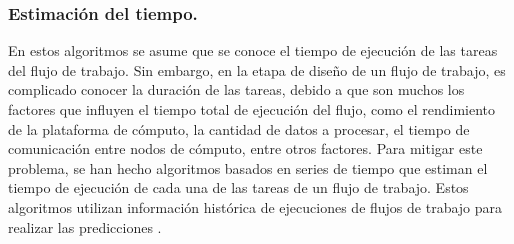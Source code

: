 	
\subsubsection{Estimación del tiempo.}

En estos algoritmos se asume que se conoce el tiempo de ejecución de las tareas del flujo de trabajo. Sin embargo, en la etapa de diseño de un flujo de trabajo, es complicado conocer la duración de las tareas, debido a que son muchos los factores que influyen el tiempo total de ejecución del flujo, como el rendimiento de la plataforma de cómputo, la cantidad de datos a procesar, el tiempo de comunicación entre nodos de cómputo, entre otros factores. Para mitigar este problema, se han hecho algoritmos basados en series de tiempo que estiman el tiempo de ejecución de cada una de las tareas de un flujo de trabajo. Estos algoritmos utilizan información histórica de ejecuciones de flujos de trabajo para realizar las predicciones  \cite{liu2011novel}.
